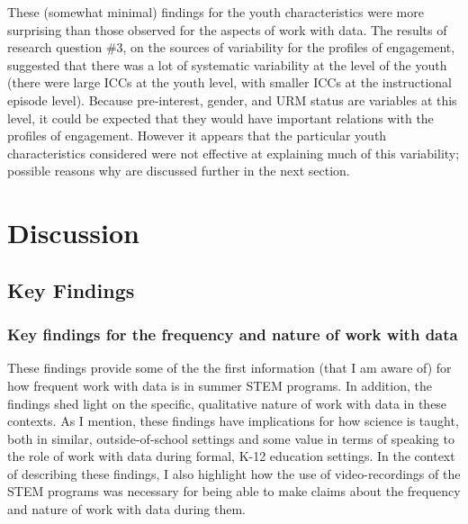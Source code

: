 \documentclass[]{msu-thesis}
\theoremstyle{definition}
\theoremstyle{definition}
\theoremstyle{definition}
\theoremstyle{remark}
\begin{document}
These (somewhat minimal) findings for the youth characteristics were
more surprising than those observed for the aspects of work with data.
The results of research question \#3, on the sources of variability for
the profiles of engagement, suggested that there was a lot of systematic
variability at the level of the youth (there were large ICCs at the
youth level, with smaller ICCs at the instructional episode level).
Because pre-interest, gender, and URM status are variables at this
level, it could be expected that they would have important relations
with the profiles of engagement. However it appears that the particular
youth characteristics considered were not effective at explaining much
of this variability; possible reasons why are discussed further in the
next section.

\chapter{Discussion}\label{discussion}

\section{Key Findings}\label{key-findings}

\subsection{Key findings for the frequency and nature of work with
data}\label{key-findings-for-the-frequency-and-nature-of-work-with-data}

These findings provide some of the the first information (that I am
aware of) for how frequent work with data is in summer STEM programs. In
addition, the findings shed light on the specific, qualitative nature of
work with data in these contexts. As I mention, these findings have
implications for how science is taught, both in similar,
outside-of-school settings and some value in terms of speaking to the
role of work with data during formal, K-12 education settings. In the
context of describing these findings, I also highlight how the use of
video-recordings of the STEM programs was necessary for being able to
make claims about the frequency and nature of work with data during
them.
\end{document}
